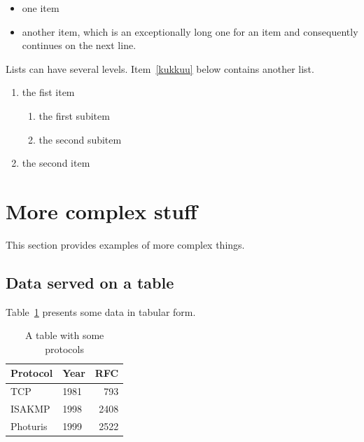 \documentclass[article]{aaltoseries}
\begin{document}
\begin{itemize}
\item one item
\item another item, which is an exceptionally long one for an item
  and consequently continues on the next line.
\end{itemize}

Lists can have several levels. Item~\ref{kukkuu} below contains
another list.
\begin{enumerate}
\item the fist item \label{kukkuu}
  \begin{enumerate}
  \item the first subitem 
  \item the second subitem
  \end{enumerate}
\item the second item
\end{enumerate}




\section{More complex stuff}

This section provides examples of more complex things.




\subsection{Data served on a table}


Table~\ref{tab:mytable1} presents some data in tabular form. 

\begin{table}[t!]
  \begin{center}
    \begin{tabular}{|l|lr|}
    \hline
    Protocol & Year &  RFC \\
    \hline
    TCP      & 1981 &  793 \\
    ISAKMP   & 1998 & 2408 \\
    Photuris & 1999 & 2522 \\
    \hline
    \end{tabular}
    \caption{A table with some protocols}
    \label{tab:mytable1}
  \end{center}
\end{table}
\end{document}
